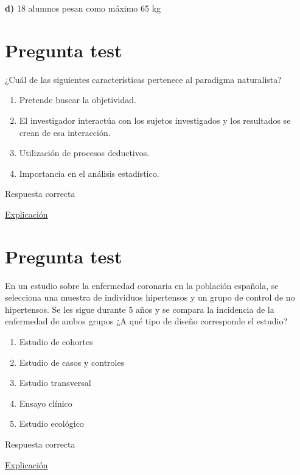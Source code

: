 \documentclass[
]{book}
\providecommand{\tightlist}{%
  \setlength{\itemsep}{0pt}\setlength{\parskip}{0pt}}
\begin{document}
\textbf{d)} 18 alumnos pesan como máximo 65 kg

\hypertarget{pregunta-test-10}{%
\section{Pregunta test}\label{pregunta-test-10}}

¿Cuál de las siguientes características pertenece al paradigma naturalista?

\begin{enumerate}
\def\labelenumi{\alph{enumi})}
\tightlist
\item
  Pretende buscar la objetividad.
\item
  El investigador interactúa con los sujetos investigados y los resultados se crean de esa interacción.
\item
  Utilización de procesos deductivos.
\item
  Importancia en el análisis estadístico.
\end{enumerate}

Respuesta correcta

\href{https://www.encyclo.co.uk/meaning-of-Naturalistic_paradigm}{Explicación}

\hypertarget{pregunta-test-11}{%
\section{Pregunta test}\label{pregunta-test-11}}

En un estudio sobre la enfermedad coronaria en la población española, se selecciona una muestra de individuos hipertensos y un grupo de control de no hipertensos. Se les sigue durante 5 años y se compara la incidencia de la enfermedad de ambos grupos ¿A qué tipo de diseño corresponde el estudio?

\begin{enumerate}
\def\labelenumi{\alph{enumi})}
\tightlist
\item
  Estudio de cohortes
\item
  Estudio de casos y controles
\item
  Estudio transversal
\item
  Ensayo clínico
\item
  Estudio ecológico
\end{enumerate}

Respuesta correcta

\href{https://es.wikipedia.org/wiki/Estudio_de_cohorte}{Explicación}
\end{document}
